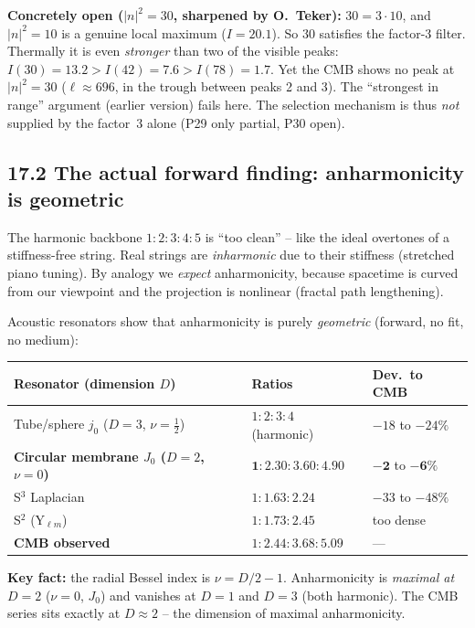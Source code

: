 \textbf{Concretely open ($|n|^2=30$, sharpened by O.~Teker):} $30=3\cdot10$,
and $|n|^2=10$ is a genuine local maximum ($I=20.1$). So $30$ satisfies the
factor-3 filter. Thermally it is even \emph{stronger} than two of the visible
peaks: $I(30)=13.2 > I(42)=7.6 > I(78)=1.7$. Yet the CMB shows no peak at
$|n|^2=30$ ($\ell\approx696$, in the trough between peaks 2 and 3). The
``strongest in range'' argument (earlier version) fails here. The selection
mechanism is thus \emph{not} supplied by the factor~3 alone (P29 only partial,
P30 open).

\subsection*{17.2 The actual forward finding: anharmonicity is geometric}

The harmonic backbone $1:2:3:4:5$ is ``too clean'' -- like the ideal overtones
of a stiffness-free string. Real strings are \emph{inharmonic} due to their
stiffness (stretched piano tuning). By analogy we \emph{expect} anharmonicity,
because spacetime is curved from our viewpoint and the projection is nonlinear
(fractal path lengthening).

Acoustic resonators show that anharmonicity is purely \emph{geometric}
(forward, no fit, no medium):

\begin{center}
\begin{tabular}{p{5.5cm}p{4.5cm}p{2cm}}
\toprule
\textbf{Resonator (dimension $D$)} & \textbf{Ratios} & \textbf{Dev.\ to CMB} \\
\midrule
Tube/sphere $j_0$ ($D=3$, $\nu=\tfrac12$) & $1:2:3:4$ (harmonic) & $-18$ to $-24\%$ \\
\textbf{Circular membrane $J_0$ ($D=2$, $\nu=0$)} & $\mathbf{1:2.30:3.60:4.90}$ & $\mathbf{-2}$ to $\mathbf{-6\%}$ \\
S$^3$ Laplacian & $1:1.63:2.24$ & $-33$ to $-48\%$ \\
S$^2$ (Y$_{\ell m}$) & $1:1.73:2.45$ & too dense \\
\midrule
\textbf{CMB observed} & $1:2.44:3.68:5.09$ & --- \\
\bottomrule
\end{tabular}
\end{center}

\textbf{Key fact:} the radial Bessel index is $\nu = D/2-1$. Anharmonicity is
\emph{maximal at $D=2$} ($\nu=0$, $J_0$) and vanishes at $D=1$ and $D=3$ (both
harmonic). The CMB series sits exactly at $D\approx2$ -- the dimension of
maximal anharmonicity.

